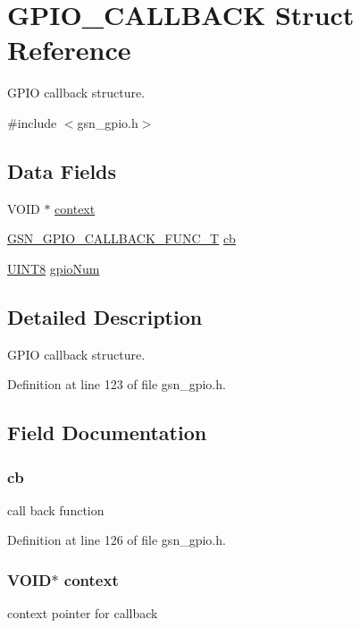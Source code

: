 \hypertarget{a00018}{
\section{GPIO\_\-CALLBACK Struct Reference}
\label{a00018}
}


GPIO callback structure.  




{\ttfamily \#include $<$gsn\_\-gpio.h$>$}

\subsection*{Data Fields}
\begin{DoxyCompactItemize}
\item 
VOID $\ast$ \hyperlink{a00018_a7e5a25499bcd2b9280a9b79d4c5b7975}{context}
\item 
\hyperlink{a00648_gae6698a8151cd85d7dac2358199ed7c6e}{GSN\_\-GPIO\_\-CALLBACK\_\-FUNC\_\-T} \hyperlink{a00018_aa4d2bdd3f077333f83ad14d410d85ce6}{cb}
\item 
\hyperlink{a00660_gab27e9918b538ce9d8ca692479b375b6a}{UINT8} \hyperlink{a00018_ae1937e31f4be10cef2fb04c31b6ae195}{gpioNum}
\end{DoxyCompactItemize}


\subsection{Detailed Description}
GPIO callback structure. 

Definition at line 123 of file gsn\_\-gpio.h.



\subsection{Field Documentation}
\hypertarget{a00018_aa4d2bdd3f077333f83ad14d410d85ce6}{
\subsubsection[{cb}]{ {\bf cb}}}
\label{a00018_aa4d2bdd3f077333f83ad14d410d85ce6}
call back function 

Definition at line 126 of file gsn\_\-gpio.h.

\hypertarget{a00018_a7e5a25499bcd2b9280a9b79d4c5b7975}{
\subsubsection[{context}]{\setlength{\rightskip}{0pt plus 5cm}VOID$\ast$ {\bf context}}}
\label{a00018_a7e5a25499bcd2b9280a9b79d4c5b7975}
context pointer for callback 


